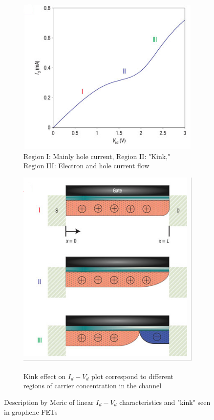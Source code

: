 \documentclass[11pt]{article}
\begin{document}
\begin{figure}[h!]
\centering
\begin{subfigure}[b]{0.3\textwidth}
    \includegraphics[width=\textwidth]{meric_kink_plot.png}
\caption{Region I: Mainly hole current, Region II: "Kink," Region III: Electron and hole current flow}
\end{subfigure}
\begin{subfigure}[b]{0.3\textwidth}
    \includegraphics[width=\textwidth]{meric_kink_explanation.png}
\caption{Kink effect on $I_d-V_d$ plot correspond to different regions of carrier concentration in the channel}
\end{subfigure}
\caption{Description by Meric of linear $I_d-V_d$ characteristics and "kink" seen in graphene FETs}
\end{figure}
\end{document}

